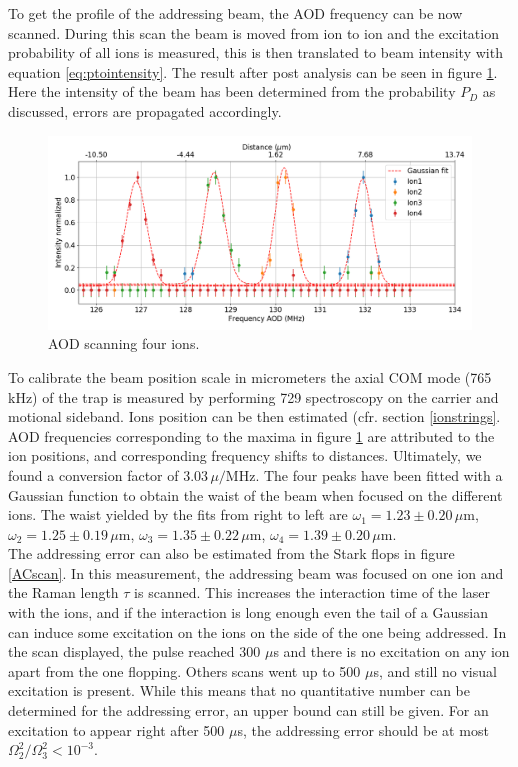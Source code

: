 To get the profile of the addressing beam, the AOD frequency can be now scanned. During this scan the beam is moved from ion to ion and the excitation probability of all ions is measured, this is then translated to beam intensity with equation \eqref{eq:ptointensity}. The result after post analysis can be seen in figure \ref{AODscan}. Here the intensity of the beam has been determined from the probability $P_D$ as discussed, errors are propagated accordingly.
\begin{figure}[H]
\centering
\includegraphics[width=\textwidth]{img/AODScan}
\caption{AOD scanning four ions.}
\label{AODscan}
\end{figure}
To calibrate the beam position scale in micrometers the axial COM mode (765 kHz) of the trap is measured by performing 729 spectroscopy on the carrier and motional sideband. Ions position can be then estimated (cfr. section \ref{ionstrings}. AOD frequencies corresponding to the maxima in figure \ref{AODscan} are attributed to the ion positions, and corresponding frequency shifts to distances. Ultimately, we found a conversion factor of $3.03\,\mu/\text{MHz}$.
The four peaks have been fitted with a Gaussian function to obtain the waist of the beam when focused on the different ions. The waist yielded by the fits from right to left are
$\omega_1 = 1.23\pm 0.20\,\mu$m, $\omega_2 = 1.25\pm 0.19\,\mu$m, $ \omega_3 = 1.35\pm 0.22\,\mu$m, $\omega_4 = 1.39\pm 0.20\,\mu$m.\\
The addressing error can also be estimated from the Stark flops in figure \ref{ACscan}. In this measurement, the addressing beam was focused on one ion and the Raman length $\tau$ is scanned. This increases the interaction time of the laser with the ions, and if the interaction is long enough even the tail of a Gaussian can induce some excitation on the ions on the side of the one being addressed. In the scan displayed, the pulse reached 300 $\mu$s and there is no excitation on any ion apart from the one flopping. Others scans went up to 500 $\mu$s, and still no visual excitation is present. While this means that no quantitative number can be determined for the addressing error, an upper bound can still be given. For an excitation to appear right after 500 $\mu$s, the addressing error should be at most $\Omega_2^2/\Omega_3^2< 10^{-3}$.

